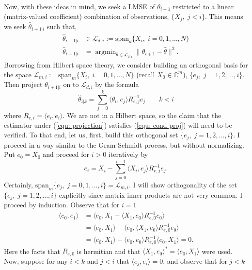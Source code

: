 \documentclass[12pt]{amsart}
\DeclareMathOperator*{\argmin}{argmin}
\newcommand{\C}{\mathbb{C}}
\begin{document}
Now, with these ideas in mind, we seek a LMSE of $\theta_{i+1}$ restricted to a linear (matrix-valued coefficient) combination of observations, $\{X_j,\;j < i\}$. This means we seek $\hat\theta_{i+1|i}$ such that,
\begin{align}
	\hat\theta_{i+1|i} &\in\mathcal{L}_{d,i} := \text{span}_d\{X_i,\;i=0,1,\dots,N\}\\
	\label{equ: cond proj}\hat\theta_{i+1|i} &= \displaystyle\argmin_{\hat\theta \in \mathcal{L}_{d,i}}\|\theta_{i+1} - \hat\theta\|^2.
\end{align}
Borrowing from Hilbert space theory, we consider building an orthogonal basis for the space $\mathcal{L}_{m,i} := \text{span}_m\{X_i,\;i=0,1,\dots,N\}$ (recall $X_0 \in \C^m$), $\{e_j,\;j = 1,2,\dots,i\}$. Then project $\theta_{i+1|i}$ on to $\mathcal{L}_{d,i}$ by the formula 
\begin{equation}
\hat{\theta}_{i|k} = \sum_{j=0}^k \langle \theta_{i}, e_j \rangle R^{-1}_{e,j} e_j\qquad k<i
\label{equ: projection}
\end{equation}
where $R_{e,i} = \langle e_i, e_i \rangle$. We are not in a Hilbert space, so the claim that the estimator under (\ref{equ: projection}) satisfies (\ref{equ: cond proj}) will need to be verified. To that end, let us, first, build this orthogonal set $\{e_j,\;j = 1,2,\dots,i\}$. I proceed in a way similar to the Gram-Schmidt process, but without normalizing. Put
$e_0 = X_0$ and proceed for $i>0$ iteratively by
\begin{equation}
e_i = X_i - \sum_{j=0}^{i-1} \langle X_i, e_j \rangle R_{e,j}^{-1}e_j.
\end{equation}
Certainly, $\text{span}_{m}\{e_j,\;j=0,1,\dots,i\} = \mathcal{L}_{m,i}$. I will show orthogonality of the set $\{e_j,\;j = 1,2,\dots,i\}$ explicitly since matrix inner products are not very common. I proceed by induction. Observe that for $i=1$
\begin{align*}
\langle e_0,e_1 \rangle &= \langle e_0,X_1 - \langle X_1,e_0\rangle R_{e,0}^{-1} e_0 \rangle\\
&=\langle e_0,X_1\rangle - \langle e_0, \langle X_1,e_0\rangle R_{e,0}^{-1} e_0 \rangle\\
&=\langle e_0,X_1\rangle - \langle e_0,e_0 \rangle R_{e,0}^{-1} \langle e_0,X_1 \rangle = 0.
\end{align*}
Here the facts that $R_{e,0}$ is hermitian and that $\langle X_1,e_0\rangle^* = \langle e_0,X_1\rangle$ were used. Now, suppose for any $i<k$ and $j<i$ that $\langle e_j,e_i \rangle = 0$, and observe that for $j<k$
\end{document}
